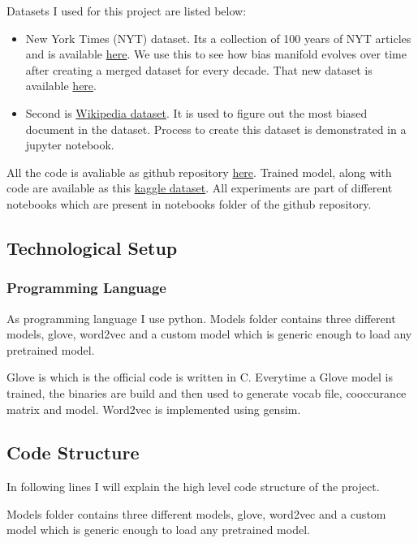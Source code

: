 \documentclass{article}
\begin{document}
Datasets I used for this project are listed below:
\begin{itemize}
    \item New York Times (NYT) dataset. Its a collection of 100 years of NYT articles and is available \href{https://www.kaggle.com/datasets/tumanovalexander/nyt-articles-data}{here}. We use this to see how bias manifold evolves over time after creating a merged dataset for every decade. That new dataset is available \href{https://www.kaggle.com/datasets/alphadraco/i535-new-dataset}{here}.
    \item Second is \href{http://www.cs.toronto.edu/~mebrunet/simplewiki-20171103-pages-articles-multistream.xml.bz2}{Wikipedia dataset}. It is used to figure out the most biased document in the dataset. Process to create this dataset is demonstrated in a jupyter notebook.
\end{itemize}
All the code is avaliable as github repository \href{https://github.com/thunderock/bias_manifold}{here}. Trained model, along with code are available as this \href{https://www.kaggle.com/datasets/alphadraco/i535project}{kaggle dataset}. All experiments are part of different notebooks which are present in notebooks folder of the github repository.

\subsection{Technological Setup}

\subsubsection{Programming Language}

As programming language I use python. Models folder contains three different models, glove, word2vec and a custom model which is generic enough to load any pretrained model.

Glove is which is the official code is written in C. Everytime a Glove model is trained, the binaries are build and then used to generate vocab file, cooccurance matrix and model. Word2vec is implemented using gensim.

\subsection{Code Structure}

In following lines I will explain the high level code structure of the project.

Models folder contains three different models, glove, word2vec and a custom model which is generic enough to load any pretrained model.
\end{document}

